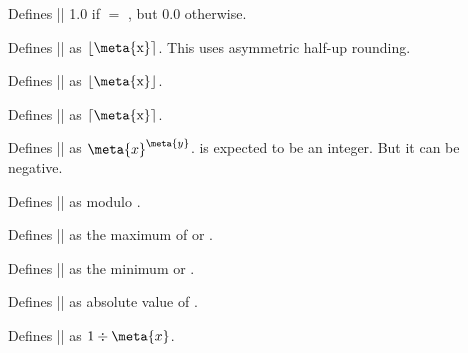 \begin{command}{\pgfmathequalto{}}       
	Defines |\pgfmathresult| 1.0 if  $=$ , but 0.0 otherwise.                    
\end{command}

\begin{command}{\pgfmathround{}}              
	Defines |\pgfmathresult| as $\left\lfloor\textrm{\meta{x}}\right\rceil$.	
	This uses asymmetric	half-up rounding.                          
\end{command}

\begin{command}{\pgfmathfloor{}}              
	Defines |\pgfmathresult| as $\left\lfloor\textrm{\meta{x}}\right\rfloor$.
\end{command}

\begin{command}{\pgfmathceil{}}               
	Defines |\pgfmathresult| as $\left\lceil\textrm{\meta{x}}\right\rceil$.                           
\end{command}
	
\begin{command}{\pgfmathpower{}}         
	Defines |\pgfmathresult| as $\meta{x}^{\meta{y}}$.  is 
	expected to be an integer. But it can be negative.
\end{command}

\begin{command}{\pgfmathmod{}}           
	Defines |\pgfmathresult| as  modulo .                       
\end{command}

\begin{command}{\pgfmathmax{}}           
	Defines |\pgfmathresult| as the maximum of  or .                       
\end{command}

\begin{command}{\pgfmathmin{}}           
	Defines |\pgfmathresult| as the minimum  or .                       
\end{command}
	
\begin{command}{\pgfmathabs{}}                
	Defines |\pgfmathresult| as  absolute value of .                                 
\end{command}

\begin{command}{\pgfmathreciprocal{}}         
	Defines |\pgfmathresult| as $1\div\meta{x}$.                                  
\end{command}
	

